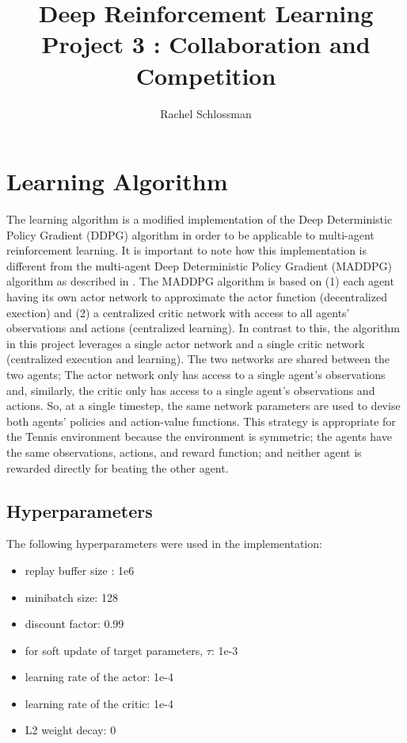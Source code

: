 \documentclass{article}
\begin{document}
\title{Deep Reinforcement Learning Project 3 : Collaboration and Competition}
\author{Rachel Schlossman}

\maketitle

\section{Learning Algorithm}
The learning algorithm is a modified implementation of the Deep Deterministic Policy Gradient (DDPG) algorithm \cite{lillicrap2015continuous} in order to be applicable to multi-agent reinforcement learning. It is important to note how this implementation is different from the multi-agent Deep Deterministic Policy Gradient (MADDPG) algorithm as described in \cite{lowe2017multi}. The MADDPG algorithm is based on (1) each agent having its own actor network to approximate the actor function (decentralized exection) and (2) a centralized critic network with access to all agents' observations and actions (centralized learning). In contrast to this, the algorithm in this project leverages a single actor network and a single critic network (centralized execution and learning). The two networks are shared between the two agents; The actor network only has access to a single agent's observations and, similarly, the critic only has access to a single agent's observations and actions. So, at a single timestep, the same network parameters are used to devise both agents' policies and action-value functions. This strategy is appropriate for the Tennis environment because the environment is symmetric; the agents have the same observations, actions, and reward function; and neither agent is rewarded directly for beating the other agent.


\subsection{Hyperparameters}
The following hyperparameters were used in the implementation:

\begin{itemize}
\item replay buffer size : 1e6
\item minibatch size: 128
\item discount factor: 0.99 
\item for soft update of target parameters, $\tau$: 1e-3
\item learning rate of the actor: 1e-4  
\item learning rate of the critic: 1e-4 
\item L2 weight decay: 0
\end{itemize}
\end{document}
